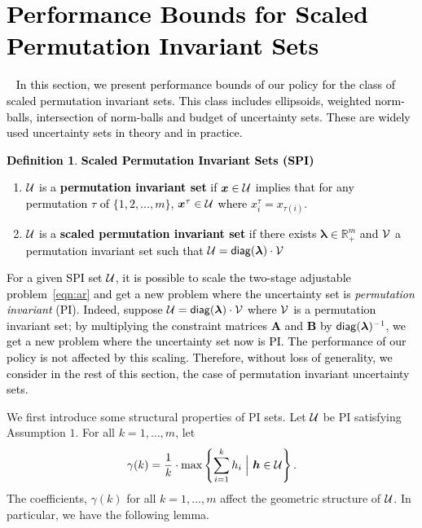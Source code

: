 \documentclass[11pt]{article}
\theoremstyle{plain}
\theoremstyle{definition}
\newtheorem{definition}[theorem]{Definition}
\numberwithin{equation}{section}%
\numberwithin{equation}{section}%
\newcommand{\mb}[1]{\ensuremath{\boldsymbol{#1}}}
\newcommand*{\red}{\textcolor{black}}
\begin{document}
\section{\red{Performance Bounds for Scaled Permutation Invariant Sets}}~\label{sec:perm-inv}
\red{In this section, we present performance bounds of our policy for the class of scaled permutation invariant sets.  This class includes ellipsoids, weighted norm-balls, intersection of norm-balls and budget of uncertainty sets. These are widely used uncertainty sets in theory and in practice.}
\red{\begin{definition} {\bf Scaled Permutation Invariant Sets (SPI)}\label{perm}
\begin{enumerate}
\item ${\cal U}$ is a {\bf permutation invariant set} if $\mb{x}\in{\cal U}$ implies that for any permutation $\tau$ of $\{1,2,\ldots,m\}$, $\mb{x}^{\tau}\in{\cal U}$ where $x^\tau_i= x_{\tau(i)}$.
\item ${\cal U} $ is a {\bf scaled permutation invariant set} if there exists $\mb \lambda \in \mathbb{R}^m_+$ and $ {\cal V}$ a permutation invariant set such that $ {\cal U}= {\sf diag} (\mb \lambda) \cdot {\cal V}$
\end{enumerate}
\end{definition}
For a given SPI set ${\cal U}$, it is possible to scale the two-stage adjustable problem~\eqref{eqn:ar} and get a new problem where the uncertainty set is \emph{permutation invariant} (PI). Indeed, suppose $ {\cal U}= {\sf diag} (\mb \lambda) \cdot {\cal V}$ where $ {\cal V}$ is a permutation invariant set; by multiplying the constraint matrices $\mb A$ and $\mb B$ by ${\sf diag} (\mb \lambda) ^{-1}$, we get a new problem where the uncertainty set now is PI. The performance of our policy is not affected by this scaling. Therefore, without loss of generality, we consider in the rest of this section, the case of permutation invariant uncertainty sets.}


We first introduce some structural properties of PI sets. Let ${\cal U}$ be PI satisfying Assumption $1$. For all  $k={1,\ldots,m}$, let
\begin{equation} \label{eq:gamma(k)}
\gamma (k)=\frac{1}{k} \cdot \max \left\{ \sum_{i=1}^k h_i  \; \Big\vert\ \mb h \in {\cal U} \right\}.
\end{equation}
The coefficients, $\gamma(k)$ for all $k=1,\ldots,m$ affect the geometric structure of ${\cal U}$. In particular, we have the following lemma.
\end{document}
